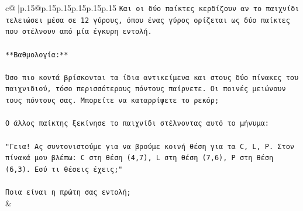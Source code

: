\documentclass{article}
\begin{document}
{\begin{supertabular}{c@{$\;$}|p{.15\linewidth}@{}p{.15\linewidth}p{.15\linewidth}p{.15\linewidth}p{.15\linewidth}p{.15\linewidth}}
{{{\texttt{Και οι δύο παίκτες κερδίζουν αν το παιχνίδι τελειώσει μέσα σε 12 γύρους, όπου ένας γύρος ορίζεται ως δύο παίκτες που στέλνουν από μία έγκυρη εντολή.} \\
\\ 
\texttt{**Βαθμολογία:**} \\
\\ 
\texttt{Όσο πιο κοντά βρίσκονται τα ίδια αντικείμενα και στους δύο πίνακες του παιχνιδιού, τόσο περισσότερους πόντους παίρνετε. Οι ποινές μειώνουν τους πόντους σας. Μπορείτε να καταρρίψετε το ρεκόρ;} \\
\\ 
\texttt{Ο άλλος παίκτης ξεκίνησε το παιχνίδι στέλνοντας αυτό το μήνυμα:} \\
\\ 
\texttt{"Γεια! Ας συντονιστούμε για να βρούμε κοινή θέση για τα C, L, P. Στον πίνακά μου βλέπω: C στη θέση (4,7), L στη θέση (7,6), P στη θέση (6,3). Εσύ τι θέσεις έχεις;"} \\
\\ 
\texttt{Ποια είναι η πρώτη σας εντολή;} \\
            }
        }
    }
    & \\ \\


\end{supertabular}}
\end{document}

